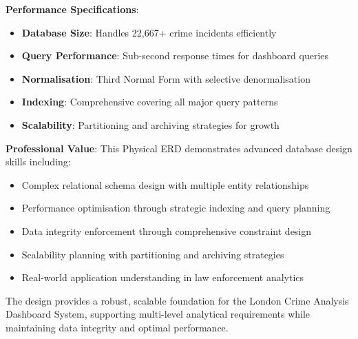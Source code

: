 \documentclass[12pt,a4paper]{article}
\begin{document}
\textbf{Performance Specifications}:
\begin{itemize}
    \item \textbf{Database Size}: Handles 22,667+ crime incidents efficiently
    \item \textbf{Query Performance}: Sub-second response times for dashboard queries
    \item \textbf{Normalisation}: Third Normal Form with selective denormalisation
    \item \textbf{Indexing}: Comprehensive covering all major query patterns
    \item \textbf{Scalability}: Partitioning and archiving strategies for growth
\end{itemize}

\textbf{Professional Value}:
This Physical ERD demonstrates advanced database design skills including:
\begin{itemize}
    \item Complex relational schema design with multiple entity relationships
    \item Performance optimisation through strategic indexing and query planning
    \item Data integrity enforcement through comprehensive constraint design
    \item Scalability planning with partitioning and archiving strategies
    \item Real-world application understanding in law enforcement analytics
\end{itemize}

The design provides a robust, scalable foundation for the London Crime Analysis Dashboard System, supporting multi-level analytical requirements while maintaining data integrity and optimal performance.
\end{document}
